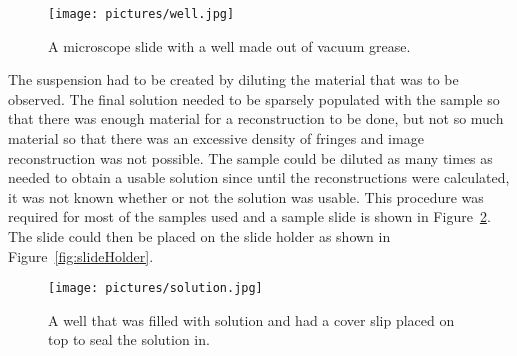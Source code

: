 \begin{figure}[htbp!]
\begin{center}
    \texttt{[image: pictures/well.jpg]}
\end{center}
\caption{A microscope slide with a well made out of vacuum grease.}
\label{fig:well}
\end{figure}

The suspension had to be created by diluting the material that was to be
observed.
The final solution needed to be
sparsely populated with the sample so that there was enough material
for a reconstruction to be done, but not so much material so that there
was an excessive density of fringes and image reconstruction was not possible.
%
%
The sample could be diluted as many
times as needed to obtain a usable solution since until the reconstructions were
calculated, it was not known whether or not the solution was usable.
This procedure was required for most of the
samples used %
and a sample slide is shown in Figure~\ref{fig:solutionSlide}.
The slide could then be
placed on the slide holder %
as shown in Figure~\ref{fig:slideHolder}.

\begin{figure}[htbp!]
\begin{center}
    \texttt{[image: pictures/solution.jpg]}
\end{center}
\caption{A well that was filled with solution and had a cover slip placed on
top to seal the solution in.}
\label{fig:solutionSlide}
\end{figure}
%
%

